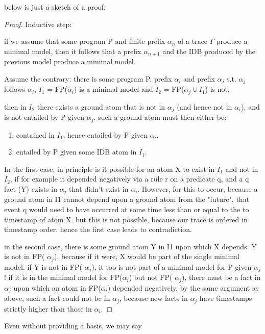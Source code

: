 below is just a sketch of a proof:

\begin{proof}

Inductive step:

if we assume that some program P and finite prefix $\alpha_n$ of a trace $\Gamma$ produce a minimal model, 
then it follows that a prefix $\alpha_{n+1}$ and the IDB produced by the previous model produce a minimal model.

Assume the contrary: there is some program P, prefix $\alpha_i$ and prefix $\alpha_j$  s.t. $\alpha_j$ follows $\alpha_i$, $I_1$ = FP($\alpha_i$) is a minimal model 
and $I_2$ = FP($\alpha_j \cup I_1$) is not.  

then in $I_2$ there exists a ground atom that is not in $\alpha_j$ (and hence not in $\alpha_i$), and is not entailed by P given $\alpha_j$.  
such a ground atom must then either be:

\begin{enumerate}
\item contained in $I_1$, hence entailed by P given $\alpha_i$.
\item entailed by P given some IDB atom in $I_1$.
\end{enumerate}

In the first case, in principle is it possible for an atom X to exist in $I_1$ and not in $I_2$, if for example it depended negatively via a 
rule r on a predicate q, and a q fact (Y) exists in  $\alpha_j$ that didn't exist in  $\alpha_i$.  However, for this to occur, because a ground atom 
in I1 cannot depend upon a ground atom from the "future", that event q would need to have occurred at some time less than 
or equal to the to timestamp of atom X.  but this is not possible, because our trace is ordered in timestamp order.  hence the 
first case leads to contradiction.

in the second case, there is some ground atom Y in I1 upon which X depends.  Y is not in FP( $\alpha_j$), because if it were, X would 
be part of the single minimal model.  if Y is not in FP( $\alpha_j$), it too is not part of a minimal model for P given  $\alpha_j$!  if it is in the minimal 
model for FP($\alpha_i$) but not FP( $\alpha_j$), there must be a fact in  $\alpha_j$ upon which an atom in FP($\alpha_i$) depended negatively.  by the same 
argument as above, such a fact could not be in  $\alpha_j$, because new facts in  $\alpha_j$ have timestamps strictly higher than those in  $\alpha_i$.
\end{proof}

Even without providing a basis, we may say